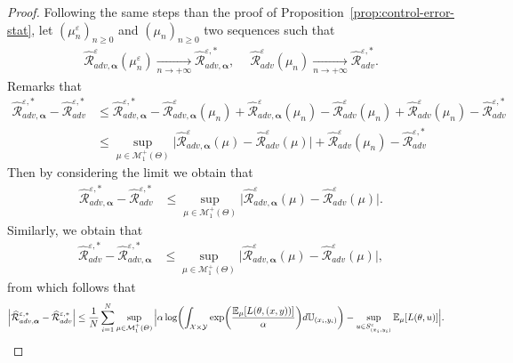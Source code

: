\begin{proof}
Following the same steps than the proof of Proposition~\ref{prop:control-error-stat}, let $(\mu_n^{\varepsilon})_{n\geq 0}$ and $(\mu_n)_{n\geq 0}$ two sequences such that
\begin{align*}
    \widehat{\mathcal{R}}_{adv,\bm{\alpha}}^{\varepsilon}(\mu_n^{\varepsilon})\xrightarrow[n \to +\infty]{}\widehat{\mathcal{R}}_{adv,\bm{\alpha}}^{\varepsilon,*},~\quad \widehat{\mathcal{R}}_{adv}^{\varepsilon}(\mu_n)\xrightarrow[n \to +\infty]{}\widehat{\mathcal{R}}_{adv}^{\varepsilon,*}.
\end{align*}
Remarks that 
\begin{align*}
  \widehat{\mathcal{R}}_{adv,\bm{\alpha}}^{\varepsilon,*} - \widehat{\mathcal{R}}_{adv}^{\varepsilon,*}&\leq \widehat{\mathcal{R}}_{adv,\bm{\alpha}}^{\varepsilon,*} - \widehat{\mathcal{R}}_{adv,\bm{\alpha}}^{\varepsilon}(\mu_n) + \widehat{\mathcal{R}}_{adv,\bm{\alpha}}^{\varepsilon}(\mu_n) -   \widehat{\mathcal{R}}_{adv}^{\varepsilon}(\mu_n)+ \widehat{\mathcal{R}}_{adv}^{\varepsilon}(\mu_n)-\widehat{\mathcal{R}}_{adv}^{\varepsilon,*}\\
  &\leq \sup_{\mu\in\mathcal{M}_1^{+}(\Theta)}\Big|\widehat{\mathcal{R}}_{adv,\bm{\alpha}}^{\varepsilon}(\mu) -   \widehat{\mathcal{R}}_{adv}^{\varepsilon}(\mu)  \Big| + \widehat{\mathcal{R}}_{adv}^{\varepsilon}(\mu_n)-\widehat{\mathcal{R}}_{adv}^{\varepsilon,*}
\end{align*}
Then by considering the limit we obtain that 
\begin{align*}
    \widehat{\mathcal{R}}_{adv,\bm{\alpha}}^{\varepsilon,*} - \widehat{\mathcal{R}}_{adv}^{\varepsilon,*}&\leq \sup_{\mu\in\mathcal{M}_1^{+}(\Theta)}\Big|\widehat{\mathcal{R}}_{adv,\bm{\alpha}}^{\varepsilon}(\mu) -   \widehat{\mathcal{R}}_{adv}^{\varepsilon}(\mu)  \Big|.
\end{align*}
Similarly, we obtain that 
\begin{align*}
     \widehat{\mathcal{R}}_{adv}^{\varepsilon,*}-\widehat{\mathcal{R}}_{adv,\bm{\alpha}}^{\varepsilon,*}&\leq \sup_{\mu\in\mathcal{M}_1^{+}(\Theta)}\Big|\widehat{\mathcal{R}}_{adv,\bm{\alpha}}^{\varepsilon}(\mu) -   \widehat{\mathcal{R}}_{adv}^{\varepsilon}(\mu)  \Big|,
\end{align*}
from which follows that
\begin{align*}
 \Big| \widehat{\mathcal{R}}_{adv,\bm{\alpha}}^{\varepsilon,*} - \widehat{\mathcal{R}}_{adv}^{\varepsilon,*}\Big|&\leq \frac{1}{\numsamples}\sum_{i=1}^\numsamples\sup_{\mu\in\mathcal{M}_1^{+}(\Theta)}\Big|\alpha\log\left(\int_{\mathcal{X}\times\mathcal{Y}}\exp\left(\frac{\mathbb{E}_{\mu}[\loss(\theta,(x,y))]}{\alpha} \right) d\mathbb{U}_{(x_i,y_i)}\right)-\sup_{u\in S^{\varepsilon}_{(x_i,y_i)}}\mathbb{E}_{\mu}[\loss(\theta,u)] \Big|.

\end{align*}
\end{proof}
